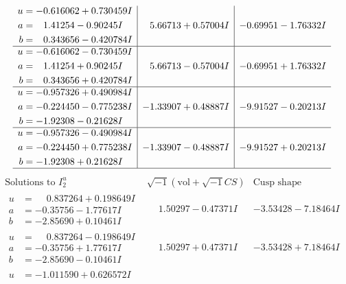 \documentclass[1p]{elsarticle_modified}
\theoremstyle{definition}
\newcommand{\I}{\sqrt{-1}}
\begin{document}
$$\begin{array}{c|c|c}
\begin{aligned}
u &= -0.616062 + 0.730459 I \\
a &= \phantom{-}1.41254 - 0.90245 I \\
b &= \phantom{-}0.343656 - 0.420784 I\end{aligned}
 & \phantom{-}5.66713 + 0.57004 I & -0.69951 - 1.76332 I \\ \hline\begin{aligned}
u &= -0.616062 - 0.730459 I \\
a &= \phantom{-}1.41254 + 0.90245 I \\
b &= \phantom{-}0.343656 + 0.420784 I\end{aligned}
 & \phantom{-}5.66713 - 0.57004 I & -0.69951 + 1.76332 I \\ \hline\begin{aligned}
u &= -0.957326 + 0.490984 I \\
a &= -0.224450 - 0.775238 I \\
b &= -1.92308 - 0.21628 I\end{aligned}
 & -1.33907 + 0.48887 I & -9.91527 - 0.20213 I \\ \hline\begin{aligned}
u &= -0.957326 - 0.490984 I \\
a &= -0.224450 + 0.775238 I \\
b &= -1.92308 + 0.21628 I\end{aligned}
 & -1.33907 - 0.48887 I & -9.91527 + 0.20213 I\\
 \hline 
 \end{array}$$\newpage$$\begin{array}{c|c|c}  
\text{Solutions to }I^u_{2}& \I (\text{vol} + \sqrt{-1}CS) & \text{Cusp shape}\\
 \hline 
\begin{aligned}
u &= \phantom{-}0.837264 + 0.198649 I \\
a &= -0.35756 - 1.77617 I \\
b &= -2.85690 + 0.10461 I\end{aligned}
 & \phantom{-}1.50297 - 0.47371 I & -3.53428 - 7.18464 I \\ \hline\begin{aligned}
u &= \phantom{-}0.837264 - 0.198649 I \\
a &= -0.35756 + 1.77617 I \\
b &= -2.85690 - 0.10461 I\end{aligned}
 & \phantom{-}1.50297 + 0.47371 I & -3.53428 + 7.18464 I \\ \hline\begin{aligned}
u &= -1.011590 + 0.626572 I \\

\end{aligned}
\end{array}$$
\end{document}
